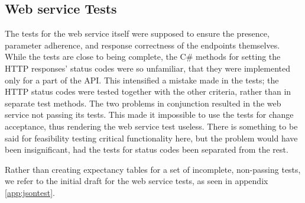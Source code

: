 \subsection{Web service Tests}
The tests for the web service itself were supposed to ensure the presence,
parameter adherence, and response correctness of the endpoints themselves.
While the tests are close to being complete, the C\# methods for setting the
HTTP responses' status codes were so unfamiliar, that they were implemented only
for a part of the API. This intensified a mistake made in the tests; the HTTP
status codes were tested together with the other criteria, rather than in
separate test methods. The two problems in conjunction resulted in the web
service not passing its tests. This made it impossible to use the tests for
change acceptance, thus rendering the web service test useless. There is
something to be said for feasibility testing critical functionality here, but
the problem would have been insignificant, had the tests for status codes been
separated from the rest.

Rather than creating expectancy tables for a set of incomplete, non-passing
tests, we refer to the initial draft for the web service tests, as seen in
appendix \ref{app:jsontest}.
